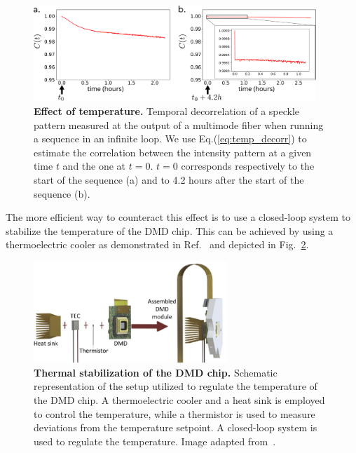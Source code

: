 \documentclass[12pt]{iopart}
\begin{document}
\begin{figure}[ht]
  \centering
  \includegraphics[width = 0.95\textwidth]{images/DMD_decorrelation_T.pdf}
  \caption{
    \textbf{Effect of temperature.}
    Temporal decorrelation of a speckle pattern measured at the output of a multimode fiber
    when running a sequence in an infinite loop.
    We use Eq.(\ref{eq:temp_decorr}) to estimate the correlation between the intensity pattern
    at a given time $t$ and the one at $t=0$.
    $t=0$ corresponds respectively to the start of the sequence (a)
    and to 4.2 hours after the start of the sequence (b).
  }
  \label{fig:temp_decorr}
\end{figure}

The more efficient way to counteract this effect is to use a
closed-loop system to stabilize the temperature of the DMD chip.
This can be achieved by using a thermoelectric cooler
as demonstrated in Ref.~\cite{Rudolf2021thermal}
and depicted in Fig.~\ref{fig:decorr_T}.

\begin{figure}
  \centering
  \includegraphics[width = 0.65\textwidth]{images/Cizmar_1.pdf}
  \caption{
    \textbf{Thermal stabilization of the DMD chip.}
    Schematic representation of the setup utilized to regulate the temperature of the DMD chip.
    A thermoelectric cooler and a heat sink is employed to control the temperature,
    while a thermistor is used to measure deviations from the temperature setpoint.
    A closed-loop system is used to regulate the temperature.
    Image adapted from~\cite{Rudolf2021thermal}.
  }
  \label{fig:decorr_T}
\end{figure}
\end{document}

